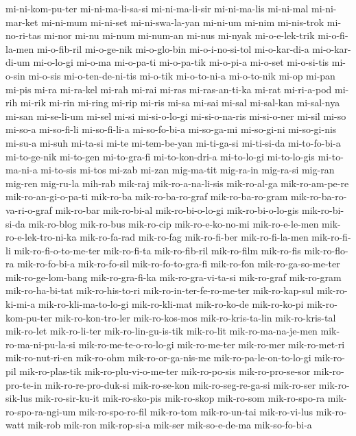 {mi-ni-kom-pu-ter mi-ni-ma-li-sa-si mi-ni-ma-li-sir mi-ni-ma-lis mi-ni-mal
mi-ni-mar-ket mi-ni-mum mi-ni-set mi-ni-swa-la-yan mi-ni-um mi-nim
mi-nis-trok mi-no-ri-tas mi-nor mi-nu mi-num mi-num-an mi-nus mi-nyak
mi-o-e-lek-trik mi-o-fi-la-men mi-o-fib-ril mi-o-ge-nik mi-o-glo-bin
mi-o-i-no-si-tol mi-o-kar-di-a mi-o-kar-di-um mi-o-lo-gi mi-o-ma
mi-o-pa-ti mi-o-pa-tik mi-o-pi-a mi-o-set mi-o-si-tis mi-o-sin mi-o-sis
mi-o-ten-de-ni-tis mi-o-tik mi-o-to-ni-a mi-o-to-nik mi-op mi-pan mi-pis
mi-ra mi-ra-kel mi-rah mi-rai mi-ras mi-ras-an-ti-ka mi-rat mi-ri-a-pod
mi-rih mi-rik mi-rin mi-ring mi-rip mi-ris mi-sa mi-sai mi-sal mi-sal-kan
mi-sal-nya mi-san mi-se-li-um mi-sel mi-si mi-si-o-lo-gi mi-si-o-na-ris
mi-si-o-ner mi-sil mi-so mi-so-a mi-so-fi-li mi-so-fi-li-a mi-so-fo-bi-a
mi-so-ga-mi mi-so-gi-ni mi-so-gi-nis mi-su-a mi-suh mi-ta-si mi-te
mi-tem-be-yan mi-ti-ga-si mi-ti-si-da mi-to-fo-bi-a mi-to-ge-nik mi-to-gen
mi-to-gra-fi mi-to-kon-dri-a mi-to-lo-gi mi-to-lo-gis mi-to-ma-ni-a
mi-to-sis mi-tos mi-zab mi-zan mig-ma-tit mig-ra-in mig-ra-si mig-ran
mig-ren mig-ru-la mih-rab mik-raj mik-ro-a-na-li-sis mik-ro-al-ga
mik-ro-am-pe-re mik-ro-an-gi-o-pa-ti mik-ro-ba mik-ro-ba-ro-graf
mik-ro-ba-ro-gram mik-ro-ba-ro-va-ri-o-graf mik-ro-bar mik-ro-bi-al
mik-ro-bi-o-lo-gi mik-ro-bi-o-lo-gis mik-ro-bi-si-da mik-ro-blog
mik-ro-bus mik-ro-cip mik-ro-e-ko-no-mi mik-ro-e-le-men
mik-ro-e-lek-tro-ni-ka mik-ro-fa-rad mik-ro-fag mik-ro-fi-ber
mik-ro-fi-la-men mik-ro-fi-li mik-ro-fi-o-to-me-ter mik-ro-fi-ta
mik-ro-fib-ril mik-ro-film mik-ro-fis mik-ro-flo-ra mik-ro-fo-bi-a
mik-ro-fo-sil mik-ro-fo-to-gra-fi mik-ro-fon mik-ro-ga-so-me-ter
mik-ro-ge-lom-bang mik-ro-gra-fi-ka mik-ro-gra-vi-ta-si mik-ro-graf
mik-ro-gram mik-ro-ha-bi-tat mik-ro-his-to-ri mik-ro-in-ter-fe-ro-me-ter
mik-ro-kap-sul mik-ro-ki-mi-a mik-ro-kli-ma-to-lo-gi mik-ro-kli-mat
mik-ro-ko-de mik-ro-ko-pi mik-ro-kom-pu-ter mik-ro-kon-tro-ler
mik-ro-kos-mos mik-ro-kris-ta-lin mik-ro-kris-tal mik-ro-let mik-ro-li-ter
mik-ro-lin-gu-is-tik mik-ro-lit mik-ro-ma-na-je-men mik-ro-ma-ni-pu-la-si
mik-ro-me-te-o-ro-lo-gi mik-ro-me-ter mik-ro-mer mik-ro-met-ri
mik-ro-nut-ri-en mik-ro-ohm mik-ro-or-ga-nis-me mik-ro-pa-le-on-to-lo-gi
mik-ro-pil mik-ro-plas-tik mik-ro-plu-vi-o-me-ter mik-ro-po-sis
mik-ro-pro-se-sor mik-ro-pro-te-in mik-ro-re-pro-duk-si mik-ro-se-kon
mik-ro-seg-re-ga-si mik-ro-ser mik-ro-sik-lus mik-ro-sir-ku-it
mik-ro-sko-pis mik-ro-skop mik-ro-som mik-ro-spo-ra mik-ro-spo-ra-ngi-um
mik-ro-spo-ro-fil mik-ro-tom mik-ro-un-tai mik-ro-vi-lus mik-ro-watt
mik-rob mik-ron mik-rop-si-a mik-ser mik-so-e-de-ma mik-so-fo-bi-a
}
